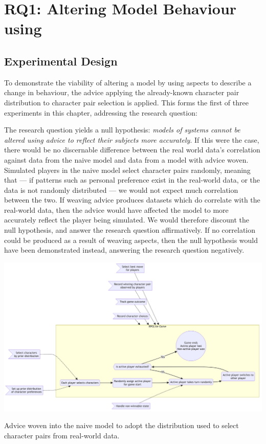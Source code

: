 \section{RQ1: Altering Model Behaviour using \AspectOrientation}
\label{sec:rq2}

\subsection{Experimental Design}

To demonstrate the viability of altering a model by using aspects to describe a
change in behaviour, the advice applying the already-known character pair
distribution to character pair selection is applied. This forms the first of
three experiments in this chapter, addressing the research question:

\begin{researchquestion}
\rqone{}
\end{researchquestion}

The research question yields a null hypothesis: \emph{models of systems cannot
be altered using advice to reflect their subjects more accurately}. If this were
the case, there would be no discernable difference between the real world data's
correlation against data from the naive model and data from a model with advice
woven. Simulated players in the naive model select character pairs randomly,
meaning that --- if patterns such as personal preference exist in the real-world
data, or the data is not randomly distributed --- we would not expect much
correlation between the two. If weaving advice produces datasets which do
correlate with the real-world data, then the advice would have affected the
model to more accurately reflect the player being simulated. We would therefore
discount the null hypothesis, and answer the research question affirmatively. If
no correlation could be produced as a result of weaving aspects, then the null
hypothesis would have been demonstrated instead, answering the research question
negatively.

\begin{table}[h]
  \centering
  \includegraphics[width=\columnwidth]{70_generality_of_aspects/diagrams/exp2_prior_distribution_model.png}
  \caption{Advice woven into the naive model to adopt the distribution used to select character pairs from real-world data.}
  \label{fig:exp1_prior_distribution_model}
\end{table}

